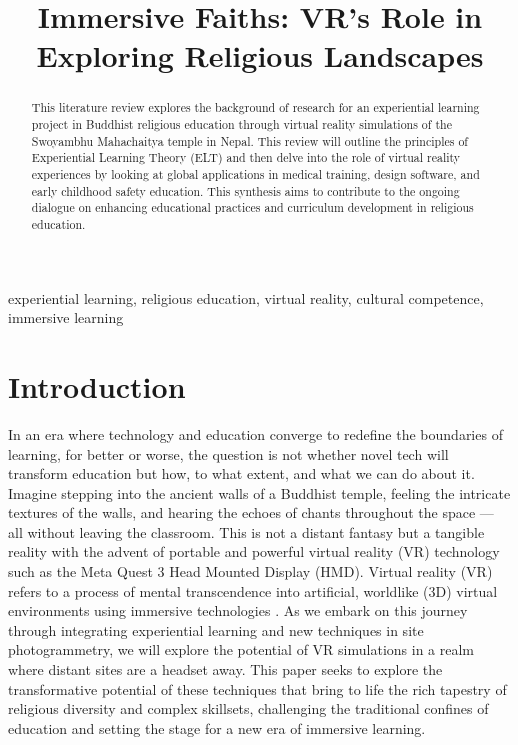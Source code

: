 \documentclass[conference]{IEEEtran}
\begin{document}
\title{Immersive Faiths: VR's Role in Exploring Religious Landscapes}

\author{
}

\maketitle

\begin{abstract}
This literature review explores the background of research for an experiential learning project in Buddhist religious education through virtual reality simulations of the Swoyambhu Mahachaitya temple in Nepal. This review will outline the principles of Experiential Learning Theory (ELT) and then delve into the role of virtual reality experiences by looking at global applications in medical training, design software, and early childhood safety education. This synthesis aims to contribute to the ongoing dialogue on enhancing educational practices and curriculum development in religious education.
\end{abstract}

\begin{IEEEkeywords}
experiential learning, religious education, virtual reality, cultural competence, immersive learning
\end{IEEEkeywords}

\section{Introduction}

In an era where technology and education converge to redefine the boundaries of learning, for better or worse, the question is not whether novel tech will transform education but how, to what extent, and what we can do about it. Imagine stepping into the ancient walls of a Buddhist temple, feeling the intricate textures of the walls, and hearing the echoes of chants throughout the space --- all without leaving the classroom. This is not a distant fantasy but a tangible reality with the advent of portable and powerful virtual reality (VR) technology such as the Meta Quest 3 Head Mounted Display (HMD). Virtual reality (VR) refers to a process of mental transcendence into artificial, worldlike (3D) virtual environments using immersive technologies \cite{ellis_what_1994}. As we embark on this journey through integrating experiential learning and new techniques in site photogrammetry, we will explore the potential of VR simulations in a realm where distant sites are a headset away. This paper seeks to explore the transformative potential of these techniques that bring to life the rich tapestry of religious diversity and complex skillsets, challenging the traditional confines of education and setting the stage for a new era of immersive learning.
\end{document}
